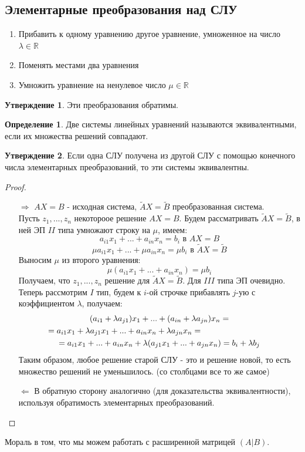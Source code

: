 \documentclass[a4paper, 12pt]{article}
\newcommand{\R}{\mathbb R}
\newcommand\tab[1][.5cm]{\hspace*{#1}}
\theoremstyle{definition}
\newtheorem*{definition}{Определение}
\newtheorem*{subtheorem}{Утверждение}
\begin{document}
    \subsection{Элементарные преобразования над СЛУ}
    \begin{enumerate}
      \item Прибавить к одному уравнению другое уравнение, умноженное на число $\lambda \in \R$
      \item Поменять местами два уравнения
      \item Умножить уравнение на ненулевое число $\mu \in \R$
    \end{enumerate}
    \begin{subtheorem}
      Эти преобразования обратимы.
    \end{subtheorem}
    \begin{definition}
      Две системы линейных уравнений называются эквивалентными, если их множества решений совпадают.
    \end{definition}
    \begin{subtheorem}
      Если одна СЛУ получена из другой СЛУ с помощью конечного числа элементарных преобразований, то эти системы эквивалентны.
    \end{subtheorem}
    \begin{proof} \tab
      \begin{itemize}
        \item[\underline{$\Longrightarrow$}]
        $AX = B$ - исходная система, $\tilde{A} X = \tilde{B}$ преобразованная система. \\
        Пусть ${z_1,...,z_n}$ некотороое решение $AX = B$. Будем рассматривать $\tilde{A} X = \tilde{B}$, в ней ЭП $II$ типа умножают строку на $\mu$, имеем:
        $$a_{i1}x_1 +...+ a_{in}x_n = b_{i} \text{ в } AX = B$$
        $$\mu a_{i1}x_1 +...+\mu a_{in}x_n = \mu b_i \text{ в } \tilde{A} X = \tilde{B}$$ 
        Выносим $\mu$ из второго уравнения:
        $$\mu (a_{i1}x_1 +...+ a_{in}x_n) = \mu b_i$$
        Получаем, что ${z_1,...,z_n}$ решение для $\tilde{A} X = \tilde{B}$. Для $III$ типа ЭП очевидно. Теперь рассмотрим $I$ тип, будем к $i$-ой строчке прибавлять $j$-ую с коэффициентом $\lambda$, получаем:
        \begin{multline*}
        (a_{i1}+\lambda a_{j1})x_1 +...+(a_{in}+\lambda a_{jn})x_n = \\ = a_{i1}x_1+\lambda a_{j1}x_1 +...+a_{in}x_n+\lambda a_{jn}x_n = \tab[3cm] \\ = a_{i1}x_1 + ... + a_{in}x_n + \lambda (a_{j1}x_1 +...+ a_{jn}x_n) = b_i + \lambda b_j
        \end{multline*}
        Таким образом, любое решение старой СЛУ - это и решение новой, то есть множество
        решений не уменьшилось. (со столбцами все то же самое)
        \item[\underline{$\Longleftarrow$}]
        В обратную сторону аналогично (для доказательства эквивалентности), используя обратимость элементарных преобразований.
      \end{itemize}
    \end{proof}
    Мораль в том, что мы можем работать с расширенной матрицей $(A|B)$.
\end{document}
